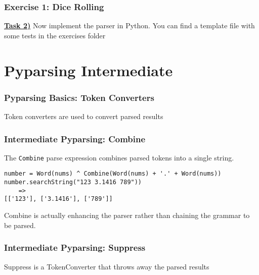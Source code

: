 \documentclass{beamer}
\begin{document}
\begin{frame}
\frametitle{Exercise 1: Dice Rolling}
\textbf{\underline{Task 2)}} Now implement the parser in Python. You can find a template file with some tests in the exercises folder
\end{frame}



\section{Pyparsing Intermediate}

\begin{frame}
\frametitle{Pyparsing Basics: Token Converters}
Token converters are used to convert parsed results
\begin{center}
\end{center}

\end{frame}


\begin{frame}[fragile]
\frametitle{Intermediate Pyparsing: Combine}
The \texttt{Combine} parse expression combines parsed tokens into a single string.

\begin{verbatim}
number = Word(nums) ^ Combine(Word(nums) + '.' + Word(nums))
number.searchString("123 3.1416 789"))
    =>
[['123'], ['3.1416'], ['789']]
\end{verbatim}
Combine is actually enhancing the parser rather than chaining the grammar to be parsed.
\end{frame}



\begin{frame}
\frametitle{Intermediate Pyparsing: Suppress}
Suppress is a TokenConverter that throws away the parsed results
\begin{center}
\end{center}

\end{frame}
\end{document}
